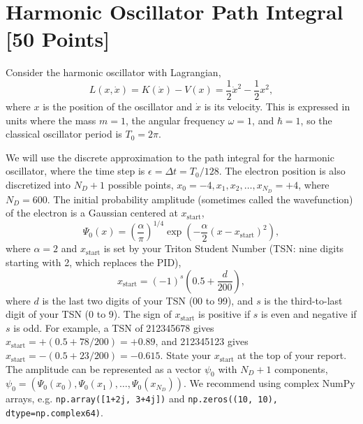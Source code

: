 \newpage
\section{Harmonic Oscillator Path Integral [50 Points]}

Consider the harmonic oscillator with Lagrangian,
\begin{equation}
  L(x, \dot{x}) = K(\dot{x}) - V(x) = \frac{1}{2}\dot{x}^2 - \frac{1}{2}x^2,
\end{equation}
where $x$ is the position of the oscillator and $\dot{x}$ is its velocity.
This is expressed in units where the mass $m=1$, the angular frequency $\omega=1$, and $\hbar=1$, so the classical oscillator period is $T_0 = 2\pi$.

We will use the discrete approximation to the path integral for the harmonic oscillator, where the time step is $\epsilon = \Delta t = T_0/128$.
The electron position is also discretized into $N_D+1$ possible points, $x_0 = -4, x_1, x_2, \ldots, x_{N_D} = +4$, where $N_D=600$.
The initial probability amplitude (sometimes called the wavefunction) of the electron is a Gaussian centered at $x_\mathrm{start}$,
\begin{equation}
  \Psi_0(x) = \left(\frac{\alpha}{\pi}\right)^{1/4}\exp\left(-\frac{\alpha}{2}(x-x_\mathrm{start})^2\right),
\end{equation}
where $\alpha = 2$ and $x_\mathrm{start}$ is set by your Triton Student Number (TSN: nine digits starting with 2, which replaces the PID),
\begin{equation}
  x_\mathrm{start} = (-1)^s\left(0.5 + \frac{d}{200}\right),
\end{equation}
where $d$ is the last two digits of your TSN (00 to 99), and $s$ is the third-to-last digit of your TSN (0 to 9).
The sign of $x_\mathrm{start}$ is positive if $s$ is even and negative if $s$ is odd.
For example, a TSN of 212345678 gives $x_\mathrm{start} = +(0.5 + 78/200) = +0.89$, and 212345123 gives $x_\mathrm{start} = -(0.5 + 23/200) = -0.615$.
State your $x_\mathrm{start}$ at the top of your report.
The amplitude can be represented as a vector $\psi_0$ with $N_D+1$ components, $\psi_0 = (\Psi_0(x_0), \Psi_0(x_1), \ldots, \Psi_0(x_{N_D}))$.
We recommend using complex NumPy arrays, e.g. \texttt{np.array([1+2j, 3+4j])} and \texttt{np.zeros((10, 10), dtype=np.complex64)}.

